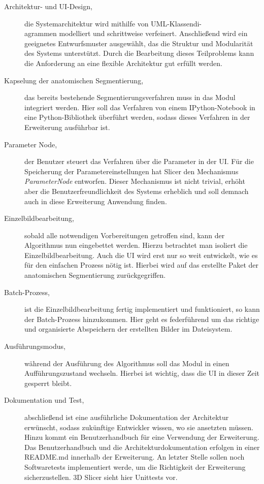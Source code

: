\begin{description}
	\item[Architektur- und \ac{UI}-Design,] die Systemarchitektur wird mithilfe von
		\ac{UML}-Klassendi-\\agrammen modelliert und schrittweise verfeinert.
		Anschließend wird ein geeignetes Entwurfsmuster ausgewählt, das die Struktur
		und Modularität des Systems unterstützt. Durch die Bearbeitung dieses
		Teilproblems kann die Anforderung an eine flexible Architektur gut erfüllt
		werden.

	\item[Kapselung der anatomischen Segmentierung,] das bereits bestehende Segmentierungsverfahren
		muss in das Modul integriert werden. Hier soll das Verfahren von einem
		IPython-Notebook in eine Python-Bibliothek überführt werden, sodass dieses Verfahren
		in der Erweiterung ausführbar ist.

	\item[Parameter Node,] der Benutzer steuert das Verfahren über die Parameter in
		der \ac{UI}. Für die Speicherung der Parametereinstellungen hat Slicer den Mechanismus
		\textit{ParameterNode} entworfen. Dieser Mechanismus ist nicht trivial,
		erhöht aber die Benutzerfreundlichkeit des Systems erheblich und soll
		demnach auch in diese Erweiterung Anwendung finden.

	\item[Einzelbildbearbeitung,] sobald alle notwendigen Vorbereitungen getroffen
		sind, kann der Algorithmus nun eingebettet werden. Hierzu betrachtet man isoliert
		die Einzelbildbearbeitung. Auch die \ac{UI} wird erst nur so weit entwickelt,
		wie es für den einfachen Prozess nötig ist. Hierbei wird auf das erstellte Paket
		der anatomischen Segmentierung zurückgegriffen.

	\item[Batch-Prozess,] ist die Einzelbildbearbeitung fertig implementiert und funktioniert,
		so kann der Batch-Prozess hinzukommen. Hier geht es federführend um das richtige
		und organisierte Abspeichern der erstellten Bilder im Dateisystem.

	\item[Ausführungsmodus,] während der Ausführung des Algorithmus soll das Modul
		in einen Aufführungszustand wechseln. Hierbei ist wichtig, dass die \ac{UI}
		in dieser Zeit gesperrt bleibt.

	\item[Dokumentation und Test,] abschließend ist eine ausführliche Dokumentation
		der Architektur erwünscht, sodass zukünftige Entwickler wissen, wo sie ansetzten
		müssen. Hinzu kommt ein Benutzerhandbuch für eine Verwendung der Erweiterung.
		Das Benutzerhandbuch und die Architekturdokumentation erfolgen in einer README.md
		innerhalb der Erweiterung. An letzter Stelle sollen noch Softwaretests
		implementiert werde, um die Richtigkeit der Erweiterung sicherzustellen. 3D
		Slicer sieht hier Unittests vor.
\end{description}

